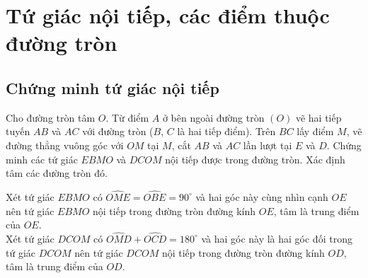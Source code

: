 
\section{Tứ giác nội tiếp, các điểm thuộc đường tròn}

\subsection*{Chứng minh tứ giác nội tiếp}

\begin{bt}%
 Cho đường tròn tâm $O$. Từ điểm $A$ ở bên ngoài đường tròn $(O)$ vẽ hai tiếp tuyến $AB$ và $AC$ với đường tròn ($B$, $C$ là hai tiếp điểm). Trên $BC$ lấy điểm $M$, vẽ đường thẳng vuông góc với $OM$ tại $M$, cắt $AB$ và $AC$ lần lượt tại $E$ và $D$. Chứng minh các tứ giác $EBMO$ và $DCOM$ nội tiếp được trong đường tròn. Xác định tâm các đường tròn đó.
 \loigiai
  {
  \immini
  {
  Xét tứ giác $EBMO$ có $\widehat{OME}=\widehat{OBE}=90^\circ$ và hai góc này cùng nhìn cạnh $OE$ nên tứ giác $EBMO$ nội tiếp trong đường tròn đường kính $OE$, tâm là trung điểm của $OE$.\\
  Xét tứ giác $DCOM$ có $\widehat{OMD}+\widehat{OCD}=180^\circ$ và hai góc này là hai góc đối trong tứ giác $DCOM$ nên tứ giác $DCOM$ nội tiếp trong đường tròn đường kính $OD$, tâm là trung điểm của $OD$. 
  }
  {
  }
  }
\end{bt}

